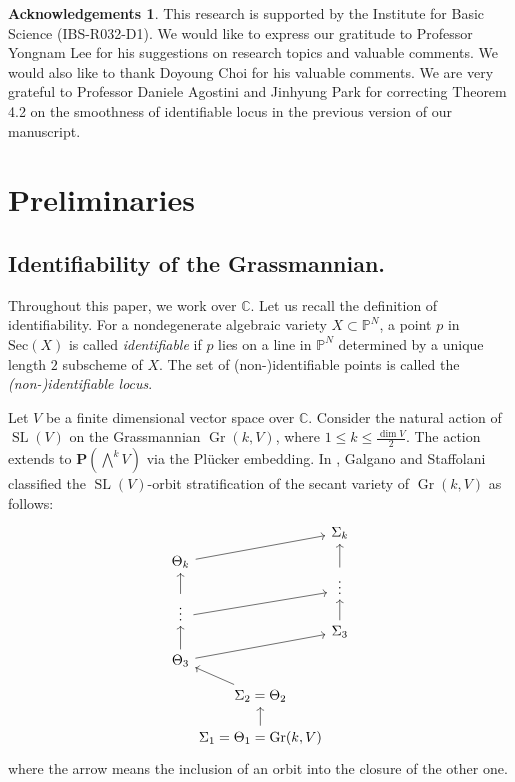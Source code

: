 \documentclass[a4paper]{amsart}
\numberwithin{equation}{section}
\theoremstyle{plain}
\theoremstyle{definition}
\newtheorem*{acknowledgements}{Acknowledgements}
\theoremstyle{remark}
\numberwithin{figure}{section}
\numberwithin{table}{section}
\numberwithin{equation}{section}
\def \CC {\mathbb{C}}
\def \PP {\mathbb{P}}
\def \Pbf {\mathbf{P}}
\DeclareMathOperator{\SL}{SL}
\DeclareMathOperator{\Gr}{Gr}
\begin{document}
\begin{acknowledgements}
This research is supported by the Institute for Basic Science (IBS-R032-D1).
We would like to express our gratitude to Professor Yongnam Lee for his suggestions on research topics and valuable comments.
We would also like to thank Doyoung Choi for his valuable comments.
We are very grateful to Professor Daniele Agostini and Jinhyung Park for correcting Theorem 4.2 on the smoothness of identifiable locus in the previous version of our manuscript.
\end{acknowledgements}



\section{Preliminaries} \label{sec:preliminaries}


\subsection{Identifiability of the Grassmannian.} \label{subsec:identifiability-of-grassmannians}
Throughout this paper, we work over $\CC$.
Let us recall the definition of identifiability.
For a nondegenerate algebraic variety $X \subset \PP^N$, a point $p$ in $\mathrm{Sec}(X)$ is called \textit{identifiable} if $p$ lies on a line in $\PP^N$ determined by a unique length $2$ subscheme of $X$.
The set of (non-)identifiable points is called the \textit{(non-)identifiable locus}.


Let $V$ be a finite dimensional vector space over $\CC$.
Consider the natural action of $\SL(V)$ on the Grassmannian $\Gr(k,V)$, where $1 \leq k \leq \frac{\dim V}{2}$.
The action extends to $\Pbf(\bigwedge^{k} V)$ via the Pl\"ucker embedding.
In \cite{GS2022}, Galgano and Staffolani classified the $\SL(V)$-orbit stratification of the secant variety of $\Gr(k,V)$ as follows:
 \[
  \begin{tikzcd}
      &[-6ex] &[-6ex] \Sigma_k \\[-3ex]
      \Theta_k \arrow{rru} & & \\[-5ex]
      & & \,\,\vdots\,\, \arrow{uu} \\[-5ex]
      \,\,\vdots\,\, \arrow{uu} \arrow{rru} & & \\[-5ex]
      & & \Sigma_3 \arrow{uu} \\[-3ex]
      \Theta_3 \arrow{uu} \arrow{rru} & & \\[-2ex]
      & \Sigma_2 = \Theta_2 \arrow{lu} & \\[-1ex]
      & \Sigma_1 = \Theta_1 = \Gr(k,V) \arrow{u} &
  \end{tikzcd}
 \]
where the arrow means the inclusion of an orbit into the closure of the other one.
\end{document}
